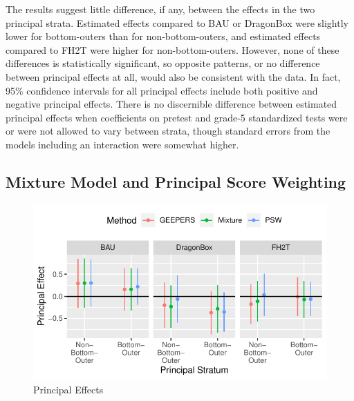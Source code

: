 \documentclass{statsoc} %
\begin{document}
The results suggest little difference, if any, between the effects in the two principal strata.
Estimated effects compared to BAU or DragonBox were slightly lower for bottom-outers than for non-bottom-outers, and estimated effects compared to FH2T were higher for non-bottom-outers.
However, none of these differences is statistically significant, so opposite patterns, or no difference between principal effects at all, would also be consistent with the data.
In fact, 95\% confidence intervals for all principal effects include both positive and negative principal effects.
There is no discernible difference between estimated principal effects when coefficients on pretest and grade-5 standardized tests were or were not allowed to vary between strata, though standard errors from the models including an interaction were somewhat higher.

\subsection{Mixture Model and Principal Score Weighting}
\begin{figure}
  \centering
  \includegraphics{../figure/compareMethods.pdf}
  \caption{Principal Effects}
  \label{fig:compare}
\end{figure}
\end{document}
